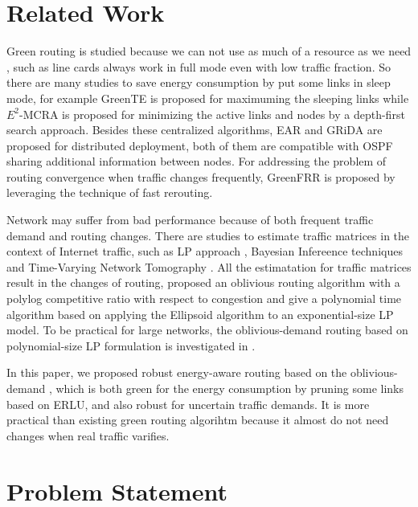 \documentclass[conference]{IEEEtran}
\begin{document}
\section{Related Work}
\label{related_work}
Green routing is studied because we can not use as much of a resource as we need \cite{networking:designing}, such as line cards always work in full mode even with 
low traffic fraction. So there are many studies to save energy consumption by put some links in sleep mode, for example GreenTE \cite{networking:greente} is 
proposed for maximuming the sleeping links while $E^2$-MCRA \cite{networking:active} is proposed for minimizing the active links and nodes by a depth-first search approach.
Besides these centralized algorithms, EAR \cite{networking:car} and GRiDA \cite{networking:grida} are proposed for distributed deployment, both of them are compatible 
with OSPF sharing additional information between nodes. For addressing the problem of routing convergence when traffic changes frequently, GreenFRR 
\cite{networking:greenfrr} is proposed by leveraging the technique of fast rerouting.

Network may suffer from bad performance because of both frequent traffic demand and routing changes. There are studies to estimate traffic matrices in the context
of Internet traffic, such as LP approach \cite{networking:lp}, Bayesian Infereence techniques \cite{networking:bayesian} and Time-Varying Network Tomography
\cite{networking:time}. All the estimatation for traffic matrices result in the changes of routing, \cite{networking:minimize} proposed an oblivious routing algorithm with a polylog 
competitive ratio with respect to congestion and \cite{networking:polynomial} give a polynomial time algorithm based on applying the Ellipsoid algorithm to an exponential-size LP model.
To be practical for large networks, the oblivious-demand routing based on polynomial-size LP formulation is investigated in \cite{networking:oblivious}.

In this paper, we proposed robust energy-aware routing based on the oblivious-demand \cite{networking:oblivious}, which is both green for the energy consumption by pruning
some links based on ERLU, and also robust for uncertain traffic demands. It is more practical than existing green routing algorihtm because it almost do not need changes when 
real traffic varifies.


\section{Problem Statement}
\label{problem_statement}
\end{document}
